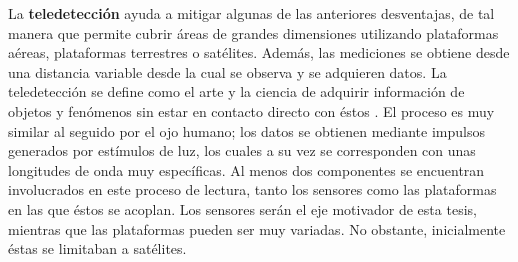 La \textbf{teledetección} ayuda a mitigar algunas de las anteriores desventajas, de tal manera que permite cubrir áreas de grandes dimensiones utilizando plataformas aéreas, plataformas terrestres o satélites. Además, las mediciones se obtiene desde una distancia variable desde la cual se observa y se adquieren datos. La teledetección se define como el arte y la ciencia de adquirir información de objetos y fenómenos sin estar en contacto directo con éstos \cite{lillesand_remote_2015}. El proceso es muy similar al seguido por el ojo humano; los datos se obtienen mediante impulsos generados por estímulos de luz, los cuales a su vez se corresponden con unas longitudes de onda muy específicas. Al menos dos componentes se encuentran involucrados en este proceso de lectura, tanto los sensores como las plataformas en las que éstos se acoplan. Los sensores serán el eje motivador de esta tesis, mientras que las plataformas pueden ser muy variadas. No obstante, inicialmente éstas se limitaban a satélites. 

